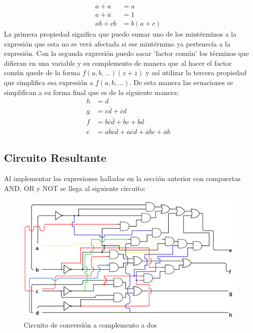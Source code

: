 \begin{align*}
	a+a            & = a      \\
	a+\overline{a} & = 1      \\
	ab+cb          & = b(a+c) 
\end{align*} 
La primera propiedad significa que puedo sumar uno de los mintérminos a la expresión que esta no se verá afectada si ese mintérmino ya pertenecía a la expresión. Con la segunda expresión puedo sacar 'factor común' los términos que difieran en una variable y su complemento de manera que al hacer el factor común quede de la forma $f(a,b,...)(z+\overline{z})$ y así utilizar la tercera propiedad que simplifica esa expresión a $f(a,b,...)$. De esta manera las ecuaciones se simplifican a su forma final que es de la siguiente manera:
\begin{align*}
	h & = d                                                                                                       \\
	g & = c\overline{d}+\overline{c}d                                                                             \\
	f & = b\overline{c}\overline{d}+\overline{b}c+\overline{b}d                                                   \\
	e & = a\overline{b}\overline{c}\overline{d}+\overline{a}\overline{c}d+\overline{a}\overline{b}c+\overline{a}b 
\end{align*}
\subsection{Circuito Resultante}
Al implementar las expresiones halladas en la sección anterior con compuertas AND, OR y NOT se llega al siguiente circuito: 
\begin{figure}[H]
    \begin{center}
	\includegraphics[scale=0.6]{circuitoEj4.png}
    \caption{Circuito de conversión a complemento a dos}
    \end{center}
\end{figure}